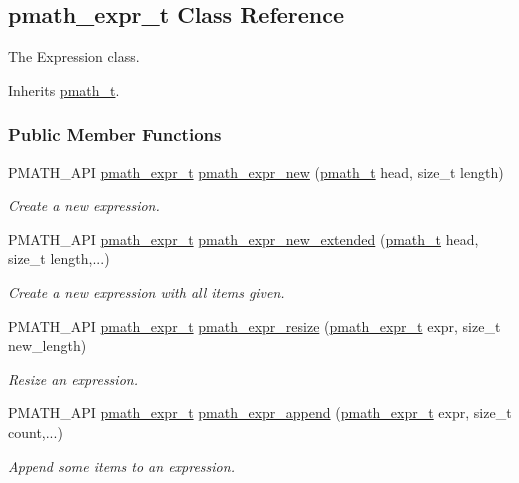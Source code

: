 \hypertarget{classpmath__expr__t}{
\subsection{pmath\_\-expr\_\-t Class Reference}
\label{classpmath__expr__t}
}
The Expression class.  


Inherits \hyperlink{classpmath__t}{pmath\_\-t}.

\subsubsection*{Public Member Functions}
\begin{CompactItemize}
\item 
PMATH\_\-API \hyperlink{classpmath__expr__t}{pmath\_\-expr\_\-t} \hyperlink{group__expressions_ga830588c2d0d6e28e78dfe6838f9935f}{pmath\_\-expr\_\-new} (\hyperlink{classpmath__t}{pmath\_\-t} head, size\_\-t length)
\begin{CompactList}\small\item\em Create a new expression. \item\end{CompactList}\item 
PMATH\_\-API \hyperlink{classpmath__expr__t}{pmath\_\-expr\_\-t} \hyperlink{group__expressions_ge2fc3e2cc7db617208f2ef97deed49d7}{pmath\_\-expr\_\-new\_\-extended} (\hyperlink{classpmath__t}{pmath\_\-t} head, size\_\-t length,...)
\begin{CompactList}\small\item\em Create a new expression with all items given. \item\end{CompactList}\item 
PMATH\_\-API \hyperlink{classpmath__expr__t}{pmath\_\-expr\_\-t} \hyperlink{group__expressions_g781924a3e0164cc27e703b486517ab4c}{pmath\_\-expr\_\-resize} (\hyperlink{classpmath__expr__t}{pmath\_\-expr\_\-t} expr, size\_\-t new\_\-length)
\begin{CompactList}\small\item\em Resize an expression. \item\end{CompactList}\item 
PMATH\_\-API \hyperlink{classpmath__expr__t}{pmath\_\-expr\_\-t} \hyperlink{group__expressions_g8057092ab059876cd19e09c2ff7296d9}{pmath\_\-expr\_\-append} (\hyperlink{classpmath__expr__t}{pmath\_\-expr\_\-t} expr, size\_\-t count,...)
\begin{CompactList}\small\item\em Append some items to an expression. \item\end{CompactList}\item 

\end{CompactItemize}

